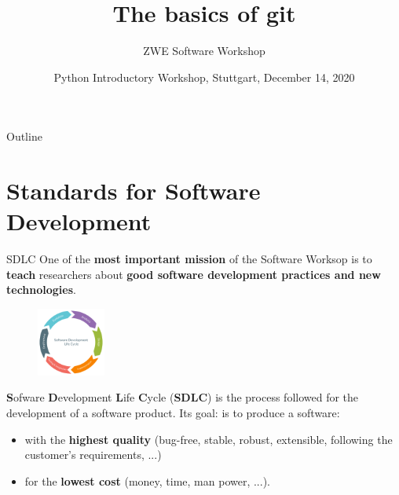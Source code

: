 \documentclass[compress,english,aspectratio=1610]{beamer}
\title{The basics of git}
\author{ZWE Software Workshop}
\institute{Max-Planck-Institut f\"ur Intelligente Systeme}
\date{\small{Python Introductory Workshop, Stuttgart, December 14, 2020}}
\let\olditem\item
\renewcommand{\item}{\setlength{\itemsep}{\fill}\olditem}
\begin{document}
\begin{frame}[plain,label=thetitle]
 \titlepage
\end{frame}



\begin{frame}{Outline}
	\tableofcontents
\end{frame}

\section{Standards for Software Development}

\begin{frame}{SDLC}
    One of the  \textbf{most important mission} of the Software Worksop is to
    \textbf{teach} researchers about \textbf{good software development practices and new technologies}.

	\begin{figure}
        \includegraphics[width=0.2\textwidth]{figures/cycle.png}
    \end{figure}

    \textbf{S}ofware \textbf{D}evelopment \textbf{L}ife \textbf{C}ycle (\textbf{SDLC}) is the process followed for the development
    of a software product. Its goal: is to produce a software:
    \begin{itemize}
        \item with the \textbf{highest quality} (bug-free, stable, robust,
        extensible, following the customer's requirements, ...)
        \item for the \textbf{lowest cost} (money, time, man power, ...).
    \end{itemize}
\end{frame}


\end{document}
